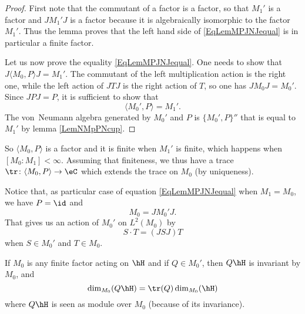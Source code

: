 \begin{proof}
First note that the commutant of a factor is a factor, so that $M_1'$ is a factor and $JM_1'J$ is a factor because it is algebraically isomorphic to the factor $M_1'$. Thus the lemma proves that the left hand side of \eqref{EqLemMPJNJequal} is in particular a finite factor.

Let us now prove the equality \eqref{EqLemMPJNJequal}. One needs to show that $J\langle M_0, P\rangle J=M_1'$. The commutant of the left multiplication action is the right one, while the left action of $JTJ$ is the right action of $T$, so one has $JM_0J=M_0'$. Since $JPJ=P$, it is sufficient to show that
\begin{equation}
	\langle M_0', P\rangle =M_1'.
\end{equation}
The von~Neumann algebra generated by $M_0'$ and $P$ is $\{ M_0',P \}''$ that is equal to $M_1'$ by lemma \ref{LemNMpPNcup}.
\end{proof}
So $\langle M_0, P\rangle $ is a factor and it is finite when $M_1'$ is finite, which happens when $[M_0:M_1]<\infty$. Assuming that finiteness, we thus have a trace $\tr\colon \langle M_0, P\rangle \to \eC$ which extends the trace on $M_0$ (by uniqueness).

Notice that, as particular case of equation \eqref{EqLemMPJNJequal} when $M_1=M_0$, we have $P=\id$ and 
\begin{equation}
	M_0=JM_0'J.
\end{equation}
That gives us an action of $M_0'$ on $L^2(M_0)$ by
\begin{equation}		\label{EqScdotTTSJT}
	S\cdot T=(JSJ)T
\end{equation}
when $S\in M_0'$ and $T\in M_0$. 

\begin{proposition}		\label{PropdimMQhHQDIMMhH}
If $M_0$ is any finite factor acting on $\hH$ and if $Q\in M_0'$, then $Q\hH$ is invariant by $M_0$, and
\begin{equation}
	\dim_{M_0}(Q\hH)=\tr(Q)\dim_{M_0}(\hH)
\end{equation}
where $Q\hH$ is seen as module over $M_0$ (because of its invariance).
\end{proposition}

